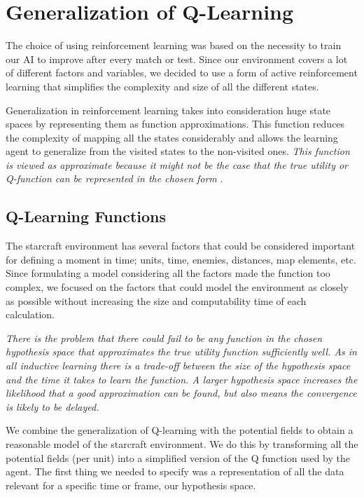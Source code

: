 \section{Generalization of Q-Learning}	\label{qlearning}

The choice of using reinforcement learning was based on the necessity to train our AI to improve after every match or test. Since our environment covers a lot of different factors and variables, we decided to use a form of active reinforcement learning that simplifies the complexity and size of all the different states. 

Generalization in reinforcement learning takes into consideration huge state spaces by representing them as function approximations. This function reduces the complexity of mapping all the states considerably and allows the learning agent to generalize from the visited states to the non-visited ones. \textit{This function is viewed as approximate because it might not be the case that the true utility or Q-function can be represented in the chosen form} \cite[p777]{rl}. 

\subsection{Q-Learning Functions}

The starcraft environment has several factors that could be considered important for defining a moment in time; units, time, enemies, distances, map elements, etc. Since formulating a model considering all the factors made the function too complex, we focused on the factors that could model the environment as closely as possible without increasing the size and computability time of each calculation. 

\textit{There is the problem that there could fail to be any function in the chosen hypothesis space that approximates the true utility function sufficiently well. As in all inductive learning there is a trade-off between the size of the hypothesis space and the time it takes to learn the function. A larger hypothesis space increases the likelihood that a good approximation can be found, but also means the convergence is likely to be delayed.}\cite[p778]{rl}

We combine the generalization of Q-learning with the potential fields to obtain a reasonable model of the starcraft environment. We do this by transforming all the potential fields (per unit) into a simplified version of the Q function used by the agent. The first thing we needed to specify was a representation of all the data relevant for a specific time or frame, our hypothesis space. 

